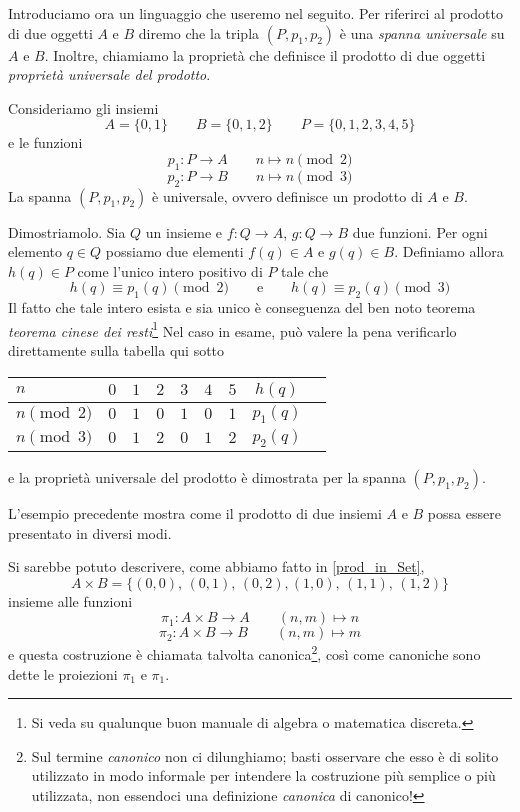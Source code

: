 \medskip
Introduciamo ora un linguaggio che useremo nel seguito. Per riferirci al prodotto di due oggetti \(A\) e \(B\) diremo che la tripla \((P,p_1,p_2)\) è una \emph{spanna universale} su  \(A\) e \(B\). Inoltre, chiamiamo la proprietà che definisce il prodotto di due oggetti \emph{proprietà universale del prodotto}.

\begin{example}\label{esempio_spanna_universale_in_Set}
Consideriamo gli insiemi
\[
A=\{0,1\}\qquad B=\{0,1,2\}\qquad P=\{0,1,2,3,4,5\}
\]
e le funzioni
\[
p_1\colon P\to A\qquad n\mapsto n\pmod 2
\]
\[
p_2\colon P\to B\qquad n\mapsto n\pmod 3
\]
La spanna \((P, p_1, p_2)\) è universale, ovvero definisce un prodotto di $A$ e $B$. 

Dimostriamolo. Sia \(Q\) un insieme e \(f\colon Q\to A\), \(g\colon Q\to B\) due funzioni. Per ogni elemento \(q\in Q\) possiamo due elementi \(f(q)\in A\) e \(g(q)\in B\). Definiamo allora \(h(q)\in P\) come l'unico intero positivo di \(P\) tale che 
\[
h(q)\equiv p_1(q) \pmod 2\qquad\text{e}\qquad h(q)\equiv p_2(q) \pmod 3
\]
Il fatto che tale intero esista e sia unico è conseguenza del ben noto teorema \emph{teorema cinese dei resti}\footnote{Si veda su qualunque buon manuale di algebra o matematica discreta.} Nel caso in esame, può valere la pena verificarlo direttamente sulla tabella qui sotto
\begin{center}
\begin{tabular}{|l|c|c|c|c|c|c|c|c|}
\hline
\(n\) & \(0\) & \(1\) & \(2\) & \(3\) & \(4\) & \(5\)& \(h(q)\) \\
\hline
\(n \pmod 2\) & \(0\) & \(1\) & \(0\) & \(1\) & \(0\) & \(1\) & \(p_1(q)\)\\
\hline
\(n \pmod 3\)  & \(0\)  & \(1\) & \(2\) & \(0\) & \(1\) & \(2\) & \(p_2(q)\)\\
\hline
\end{tabular} 	
\end{center}
e la proprietà universale del prodotto è dimostrata per la spanna \((P, p_1, p_2)\).
\end{example}
L'esempio precedente mostra come il prodotto di due insiemi \(A\) e \(B\) possa essere presentato in diversi modi. 

Si sarebbe potuto descrivere, come abbiamo fatto  in \ref{prod_in_Set},
\[
A\times B=\{(0,0),\,(0,1),\,(0,2),(1,0),\,(1,1),\,(1,2)\}
\]
insieme alle funzioni 
\[
\pi_1\colon A\times B\to A\qquad (n,m)\mapsto n
\]
\[
\pi_2 \colon A\times B\to B\qquad (n,m)\mapsto m
\]
e questa costruzione è chiamata talvolta canonica\footnote{Sul termine \emph{canonico} non ci dilunghiamo; basti osservare che esso è di solito utilizzato in modo informale per intendere la costruzione più semplice o più utilizzata, non essendoci una definizione \emph{canonica} di canonico!}, così come canoniche sono dette le proiezioni \(\pi_1\) e \(\pi_1\). 

